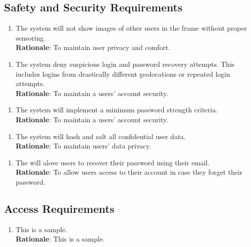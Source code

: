 \documentclass{article}
\begin{document}
\subsection{Safety and Security Requirements}
\begin{enumerate}[{SR}1. ]
    \item The system will not show images of other users in the frame without proper sensoring.\\
    \textbf{Rationale}: To maintain user privacy and comfort. 
\end{enumerate} 
\begin{enumerate}[{SR}Mag2. ]
    \item The system deny suspicious login and password recovery attempts. This includes logins from drastically different geolocations or repeated login attempts.\\
    \textbf{Rationale}: To maintain a users' account security. 
\end{enumerate} 
\begin{enumerate}[{SR}Mag3. ]
    \item The system will implement a minimum password strength criteria.\\
    \textbf{Rationale}: To maintain a users' account security. 
\end{enumerate} 
\begin{enumerate}[{SR}Mag4. ]
    \item The system will hash and salt all confidential user data.\\
    \textbf{Rationale}: To maintain users' data privacy. 
\end{enumerate} 
\begin{enumerate}[{SR}Mag5. ]
    \item The will alove users to recover their password using their email.\\
    \textbf{Rationale}: To allow users access to their account in case they forget their password. 
\end{enumerate} 

\subsection{Access Requirements}
\begin{enumerate}[{AR}1. ]
    \item This is a sample.\\
    \textbf{Rationale}: This is a sample. 
\end{enumerate} 
\end{document}
